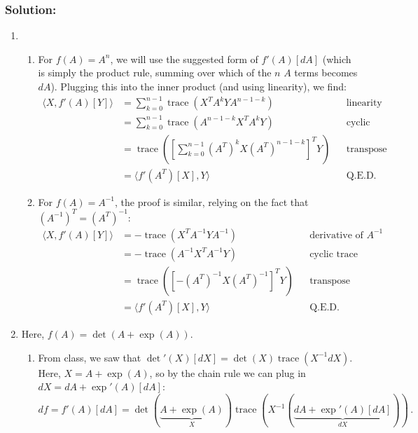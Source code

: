 \documentclass[10pt,oneside]{article}
\newcommand{\tr}{\operatorname{trace}}
\begin{document}
\subsubsection*{Solution:}

\begin{enumerate}
    \item 
   \begin{enumerate}
    \item For $f(A) = A^n$, we will use the suggested form of $f'(A)[dA]$ (which is simply the product rule, summing over which of the $n$ $A$ terms becomes $dA$).  Plugging this into the inner product (and using linearity), we find:
    \begin{equation}
    \begin{align*}
    \langle X, f'(A)[Y] \rangle &=
    \sum_{k=0}^{n-1} \tr \left( X^T A^k Y A^{n-1-k} \right) && \text{linearity}\\
    &= \sum_{k=0}^{n-1} \tr \left( A^{n-1-k} X^T A^k Y  \right)
     && \text{cyclic trace}\\
    &=  \tr \left(   \left[ \sum_{k=0}^{n-1} (A^T)^k X (A^T)^{n-1-k} \right] ^T  Y  \right)
     && \text{transpose + linearity} \\
     &= \langle f'(A^T)[X], Y \rangle && \text{Q.E.D.}
    \end{align*}
    \end{equation}

    \item For $f(A) = A^{-1}$, the proof is similar, relying on the fact that $(A^{-1})^T = (A^T)^{-1}$:
    \begin{equation}
    \begin{align*}
    \langle X, f'(A)[Y] \rangle &= -\tr\left( X^T A^{-1} Y A^{-1} \right) && \text{derivative of }A^{-1}\\
    &= -\tr\left( A^{-1} X^T A^{-1} Y  \right) && \text{cyclic trace}\\
    &= \tr\left( [-(A^T)^{-1} X (A^T)^{-1}]^T Y  \right) && \text{transpose}\\
     &= \langle f'(A^T)[X], Y \rangle && \text{Q.E.D.}
    \end{align*}
    \end{equation}
    
    \end{enumerate}
    
    \item Here, $f(A)=\det(A+\exp(A))$.
     
   \begin{enumerate}
   \item
   From class, we saw that $\det'(X)[dX] = \det(X) \tr(X^{-1} dX)$.  Here, $X = A + \exp(A)$, so by the chain rule we can plug in $dX = dA + \exp'(A)[dA]$:
    $$
    df = f'(A)[dA] = \boxed{\det(\underbrace{A + \exp(A)}_X) \tr\left( X^{-1} (\underbrace{dA +\exp'(A)[dA]}_{dX})  \right)} \, .
    $$


\end{enumerate}
\end{enumerate}
\end{document}
